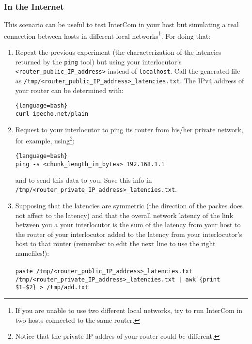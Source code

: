 \subsubsection{In the Internet}

This scenario can be useful to test InterCom in your host but
simulating a real connection between hosts in different local
networks\footnote{If you are unable to use two different local
  networks, try to run InterCom in two hosts connected to the same
  router.}. For doing that:

\begin{enumerate}
  
\item Repeat the previous experiment (the characterization of the
  latencies returned by the \verb|ping| tool) but using your
  interlocutor's \verb|<router_public_IP_address>| instead of
  \verb|localhost|. Call the generated file as
  \verb|/tmp/<router_public_IP_address>_latencies.txt|. The IPv4
  address of your router can be determined with:
  
  \begin{lstlisting}{language=bash}
curl ipecho.net/plain
  \end{lstlisting}  
  
\item Request to your interlocutor to ping its router from his/her
  private network, for example, using\footnote{Notice that the private
    IP addres of your router could be different.}:
  
  \begin{lstlisting}{language=bash}
ping -s <chunk_length_in_bytes> 192.168.1.1
  \end{lstlisting}
  
  and to send this data to you. Save this info in
  \verb|/tmp/<router_private_IP_address>_latencies.txt|.

\item Supposing that the latencies are symmetric (the direction of the
  packes does not affect to the latency) and that the overall network
  latency of the link between you a your interlocutor is the sum of
  the latency from your host to the router of your interlocutor added
  to the latency from your interlocutor's host to that router
  (remember to edit the next line to use the right namefiles!):\\\\

\texttt{paste /tmp/<router\_public\_IP\_address>\_latencies.txt /tmp/<router\_private\_IP\_address>\_latencies.txt | awk
  \textquotesingle\{print \$1+\$2\}\textquotesingle~> /tmp/add.txt}\\


\end{enumerate}
